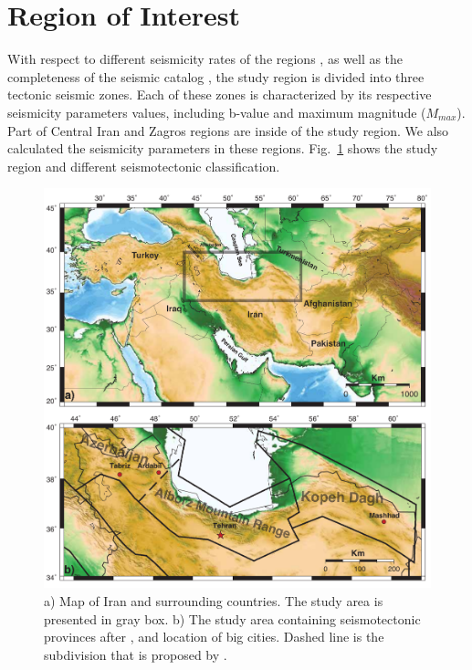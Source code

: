 \section{Region of Interest}

With respect to different seismicity rates of the regions \citep{Nemati2015}, as well as the completeness of the seismic catalog \citep{Zare2014} , the study region is divided into three tectonic seismic zones. Each of these zones is characterized by its respective seismicity parameters values, including b-value and maximum magnitude ($M{_{max}}$). Part of Central Iran and Zagros regions are inside of the study region. We also calculated the seismicity parameters in these regions. Fig.~\ref{fig:Iran} shows the study region and different seismotectonic classification.

\begin{figure}[!ht] 
\centering
\includegraphics[scale=0.7]{figures/pdf/Figure1.pdf} 
\caption{ a) Map of Iran and surrounding countries. The study area is presented in gray box. b) The study area containing seismotectonic provinces after \citet{Mirzaei1998}, and location of big cities. Dashed line is the subdivision that is proposed by \citet{Karimiparidari2013}. }
 
\label{fig:Iran}
\end{figure}

